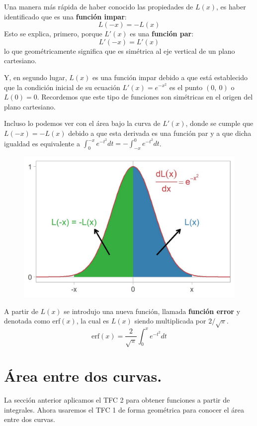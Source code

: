 \documentclass[12pt]{article}
\begin{document}
Una manera más rápida de haber conocido las propiedades de $L(x)$, es haber identificado que es una \textbf{función impar}:
\[
  L(-x) = -L(x)
\]
Esto se explica, primero, porque $L'(x)$ es una \textbf{función par}:
\[
  L'(-x) = L'(x)
\]
lo que geométricamente significa que es simétrica al eje vertical de un plano cartesiano.

Y, en segundo lugar, $L(x)$ es una función impar debido a que está establecido que la condición inicial de su ecuación $L'(x) = e^{-x^{2}}$ es el punto $(0, \ 0)$ o $L(0) = 0$. Recordemos que este tipo de funciones son simétricas en el origen del plano cartesiano.

Incluso lo podemos ver con el área bajo la curva de $L'(x)$, donde se cumple que $L(-x) = -L(x)$ debido a que esta derivada es una función par y a que dicha igualdad es equivalente a $\int_{0}^{-x} e^{-t^{2}}dt = -\int_{-x}^{0} e^{-t^{2}}dt$.

\begin{figure}[hbt!]
\centering
\includegraphics[scale=0.7]{img/deriv_pre_erf_plot.jpg}
\end{figure}

A partir de $L(x)$ se introdujo una nueva función, llamada \textbf{función error} y denotada como erf$(x)$, la cual es $L(x)$ siendo multiplicada por $2/\sqrt{\pi}$.
\[
  \text{erf}(x) = \frac{2}{\sqrt{\pi}} \int_{0}^{x} e^{-t^{2}}dt
\]


\section{Área entre dos curvas.}

La sección anterior aplicamos el TFC 2 para obtener funciones a partir de integrales. Ahora usaremos el TFC 1 de forma geométrica para conocer el área entre dos curvas.
\end{document}
